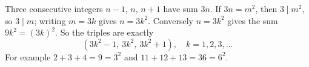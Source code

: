 Three consecutive integers $n-1$, $n$, $n+1$ have sum $3n$. If $3n=m^2$, then $3\mid m^2$, so $3\mid m$; writing $m=3k$ gives $n=3k^2$. Conversely $n=3k^2$ gives the sum $9k^2=(3k)^2$. So the triples are exactly
\[
\boxed{\left(3k^2-1,\ 3k^2,\ 3k^2+1\right),\quad k=1,2,3,\dots}
\]
For example $2+3+4=9=3^2$ and $11+12+13=36=6^2$.
